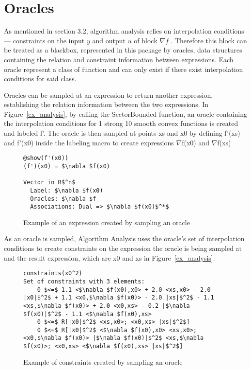 \section{Oracles} \label{oracles}
As mentioned in section 3.2, algorithm analysis relies on interpolation conditions --- constraints on the input $y$ and output $u$ of block \( \nabla f \) . Therefore this block can be treated as a blackbox, represented in this package by oracles, data structures containing the relation and constraint information between expressions. Each oracle represent a class of function and can only exist if there exist interpolation conditions for said class.

Oracles can be sampled at an expression to return another expression, establishing the relation information between the two expressions.  In Figure~\ref{ex_analysis}, by calling the SectorBounded function, an oracle containing the interpolation conditions for 1 strong 10 smooth convex functions is created and labeled f'. The oracle is then sampled at points xs and x0 by defining f'(xs) and f'(x0) inside the labeling macro to create expressions $\nabla $f(x0) and $\nabla $f(xs)

\begin{figure}[!h]
	\begin{lstlisting}[mathescape]
@show(f'(x0))
(f')(x0) = $\nabla $f(x0)

Vector in R$^n$
  Label: $\nabla $f(x0)
  Oracles: $\nabla $f
  Associations: Dual => $\nabla $f(x0)$^*$

\end{lstlisting}
\caption{Example of an expression created by sampling an oracle}
\label{ex_sampling}
\end{figure}

As an oracle is sampled, Algorithm Analysis uses the oracle's set of interpolation conditions to create constraints on the expression the oracle is being sampled at and the result expression, which are x0 and xs in Figure~\ref{ex_analysis}.

\begin{figure}[!h]
	\begin{lstlisting}[mathescape]
constraints(x0^2)
Set of constraints with 3 elements:
	0 $<=$ 1.1 <$\nabla $f(x0),x0> + 2.0 <xs,x0> - 2.0 |x0|$^2$ + 1.1 <x0,$\nabla $f(x0)> - 2.0 |xs|$^2$ - 1.1 <xs,$\nabla $f(x0)> + 2.0 <x0,xs> - 0.2 |$\nabla $f(x0)|$^2$ - 1.1 <$\nabla $f(x0),xs>
	0 $<=$ R[|x0|$^2$ <xs,x0>; <x0,xs> |xs|$^2$]
	0 $<=$ R[|x0|$^2$ <$\nabla $f(x0),x0> <xs,x0>; <x0,$\nabla $f(x0)> |$\nabla $f(x0)|$^2$ <xs,$\nabla $f(x0)>; <x0,xs> <$\nabla $f(x0),xs> |xs|$^2$]
	\end{lstlisting}
	\caption{Example of constraints created by sampling an oracle}
	\label{ex_orc_constraints}
\end{figure}

